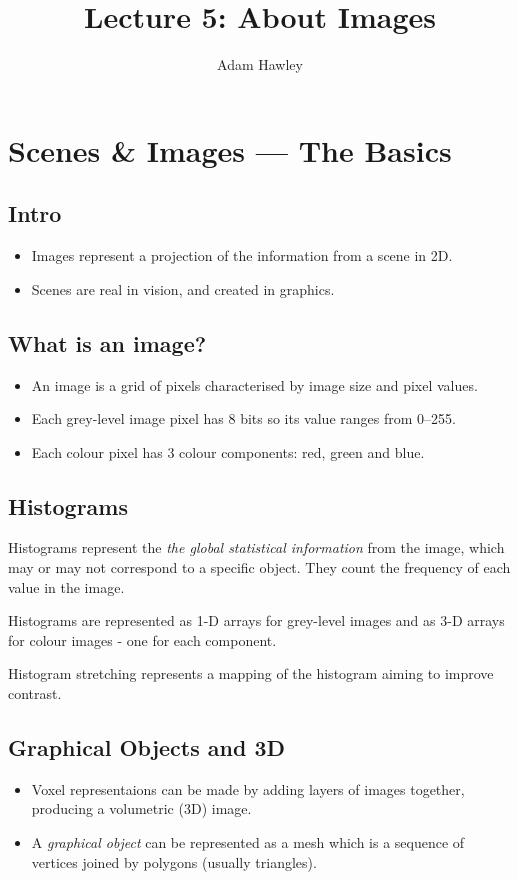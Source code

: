 \documentclass{article}
\begin{document}
\title{Lecture 5: About Images}
\author{Adam Hawley}

\maketitle

\section{Scenes \& Images --- The Basics}
\subsection{Intro}
\begin{itemize}
	\item Images represent a projection of the information from a scene in 2D.
	\item Scenes are real in vision, and created in graphics.
\end{itemize}
\subsection{What is an image?}
\begin{itemize}
	\item An image is a grid of pixels characterised by image size and pixel values.
	\item Each grey-level image pixel has 8 bits so its value ranges from 0--255. 
	\item Each colour pixel has 3 colour components: red, green and blue.
\end{itemize}

\subsection{Histograms}
Histograms represent the {\it the global statistical information} from the image, which may or may not correspond to a specific object. 
They count the frequency of each value in the image.

Histograms are represented as 1-D arrays for grey-level images and as 3-D arrays for colour images - one for each component.

Histogram stretching represents a mapping of the histogram aiming to improve contrast.

\subsection{Graphical Objects and 3D}
\begin{itemize}
	\item Voxel representaions can be made by adding layers of images together, producing a volumetric (3D) image.
	\item A {\it graphical object} can be represented as a mesh which is a sequence of vertices joined by polygons (usually triangles).
\end{itemize}
\end{document}
